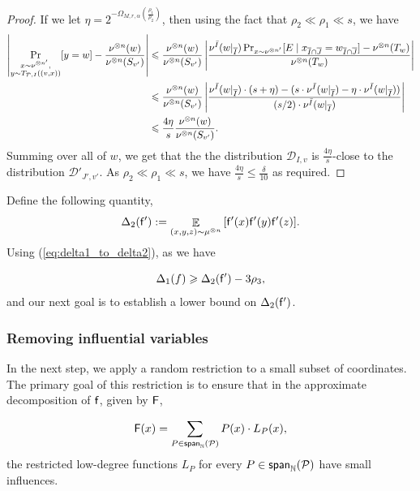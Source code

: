 \documentclass[10pt,a4paper]{amsart}
\newcommand\card[1]{\left| {#1} \right|}
\newcommand\Expect[2]{{\mathop{\mathbb{E}}_{#1}\left[ {#2} \right]}}
\newcommand\spn{{\sf span}_{\mathbb{N}}}
\renewcommand\geq{\geqslant}
\renewcommand\leq{\leqslant}
\newcommand{\V}[1]{{#1}}
\begin{document}
\begin{proof}
If we let $\eta = 2^{-\Omega_{M,r,\alpha}\left(\frac{\rho_1}{\rho_2}\right)}$, then using the fact that $\rho_2\ll \rho_1\ll s$, we have
\begin{align*}
    \card{\Pr_{\substack{x\sim \nu^{\otimes n'},\\ y\sim {\rm T}_{\mathcal{P},I} ((v, x))}}[y=w]  - \frac{\nu^{\otimes n}(w)}{\nu^{\otimes n}(S_{v'})}} &\leq \frac{\nu^{\otimes n}(w)}{\nu^{\otimes n}(S_{v'})}\card{ \frac{\nu^{\bar{I}}(w|_{\overline{I}})\Pr_{x\sim \nu^{\otimes n'}}[ E \mid x_{\overline{I}\cap \overline{J}} = w_{\overline{I}\cap \overline{J}}] - \nu^{\otimes n}(T_w)}{\nu^{\otimes n}(T_w)}}\\
    & \leq \frac{\nu^{\otimes n}(w)}{\nu^{\otimes n}(S_{v'})}\card{ \frac{\nu^{\bar{I}}(w|_{\overline{I}})\cdot (s+\eta) - (s\cdot \nu^{\bar{I}}(w|_{\overline{I}})-\eta\cdot \nu^{\bar{I}}(w|_{\overline{I}}))}{(s/2)\cdot \nu^{\bar{I}}(w|_{\overline{I}})}}\\
    &\leq \frac{4\eta}{s} \frac{\nu^{\otimes n}(w)}{\nu^{\otimes n}(S_{v'})}.
\end{align*}
Summing over all of $w$, we get that the the distribution $\mathcal{D}_{I,v}$ is $\frac{4\eta}{s}$-close to the distribution $\mathcal{D}'_{J', v'}$. As $\rho_2\ll \rho_1\ll s$, we have $\frac{4\eta}{s}\leq \frac{\delta}{10}$ as required.
\end{proof} 


Define the following quantity, 
$$\Delta_2(\noisyfrefined) :=\Expect{(\V x, \V y, \V z)\sim \mu^{\otimes n}}{\noisyfrefined(\V x) \noisyfrefined(\V y) \noisyfrefined(\V z)}.$$
 Using (\ref{eq:delta1_to_delta2}), as we have

\begin{equation}\label{eq:Delta_1_to_2}
    \Delta_1(f)\geq \Delta_2(\noisyfrefined) -3\rho_3,
\end{equation}
and our next goal is to establish a lower bound on  $\Delta_2(\mathsf{f}')$.


\subsubsection{Removing influential variables}
\label{sec:remove_inf}



In the next step, we apply a random restriction to a small subset of coordinates. The primary goal of this restriction is to ensure that in the approximate decomposition of $\mathsf{f}$, given by ${\mathsf{F}}$,

  \[
	\fcoarsedecomposed(\V x) = \sum\limits_{P\in\spn(\mathcal{P})} P(\V x) \cdot L_P(\V x),
	\]
the restricted low-degree functions $L_P$ for every $P\in \spn(\mathcal{P})$ have small influences.
\end{document}
